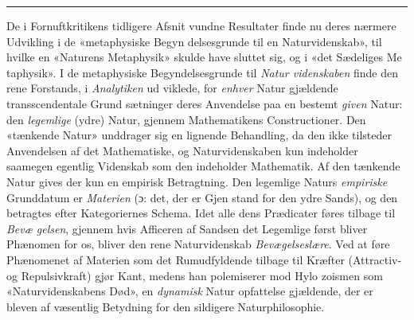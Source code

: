 \documentclass[12pt,a4paper]{book}
\newcommand{\divrule}{\begin{center}\rule{2cm}{0.4pt}\end{center}}
\begin{document}
\divrule

De i Fornuftkritikens tidligere Afsnit vundne Resultater
finde nu deres nærmere Udvikling i de «metaphysiske Begyn\-%
delsesgrunde til en Naturvidenskab», til hvilke en «Naturens
Metaphysik» skulde have sluttet sig, og i «det Sædeliges Me\-%
taphysik». I de metaphysiske Begyndelsesgrunde til \emph{Natur\-%
videnskaben} finde den rene Forstands, i \emph{Analytiken} ud\-%
viklede, for \emph{enhver} Natur gjældende transscendentale Grund\-%
sætninger deres Anvendelse paa en bestemt \emph{given} Natur: den
\emph{legemlige} (ydre) Natur, gjennem Mathematikens Constructioner.
Den «tænkende Natur» unddrager sig en lignende Behandling,
da den ikke tilsteder Anvendelsen af det Mathematiske, og
Naturvidenskaben kun indeholder saamegen egentlig Videnskab
som den indeholder Mathematik. Af den tænkende Natur
gives der kun en empirisk Betragtning. Den legemlige Naturs
\emph{empiriske} Grunddatum er \emph{Materien} (ɔ: det, der er Gjen\-%
stand for den ydre Sands), og den betragtes efter Kategoriernes
Schema. Idet alle dens Prædicater føres tilbage til \emph{Bevæ\-%
gelsen}, gjennem hvis Afficeren af Sandsen det Legemlige
først bliver Phænomen for os, bliver den rene Naturvidenskab
\emph{Bevægelseslære}. Ved at føre Phænomenet af Materien
som det Rumudfyldende tilbage til Kræfter (Attractiv- og
Repulsivkraft) gjør Kant, medens han polemiserer mod Hylo\-%
zoismen som «Naturvidenskabens Død», en \emph{dynamisk} Natur\-%
opfattelse gjældende, der er bleven af væsentlig Betydning for
den sildigere Naturphilosophie.
\end{document}
